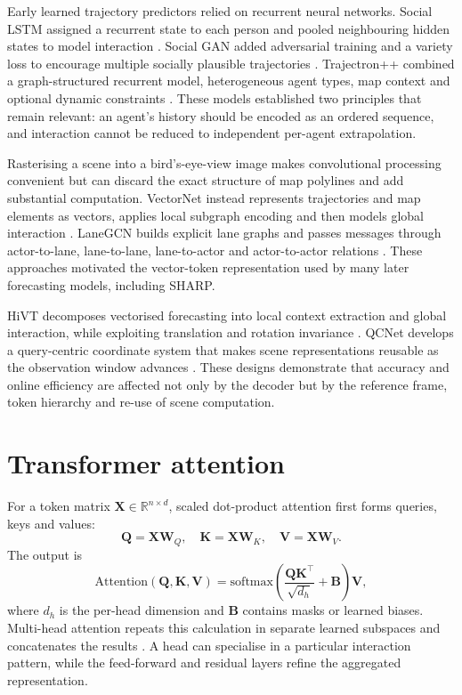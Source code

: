 Early learned trajectory predictors relied on recurrent neural networks. Social LSTM assigned a recurrent state to each person and pooled neighbouring hidden states to model interaction \cite{alahi2016sociallstm}. Social GAN added adversarial training and a variety loss to encourage multiple socially plausible trajectories \cite{gupta2018socialgan}. Trajectron++ combined a graph-structured recurrent model, heterogeneous agent types, map context and optional dynamic constraints \cite{salzmann2020trajectron}. These models established two principles that remain relevant: an agent's history should be encoded as an ordered sequence, and interaction cannot be reduced to independent per-agent extrapolation.

Rasterising a scene into a bird's-eye-view image makes convolutional processing convenient but can discard the exact structure of map polylines and add substantial computation. VectorNet instead represents trajectories and map elements as vectors, applies local subgraph encoding and then models global interaction \cite{gao2020vectornet}. LaneGCN builds explicit lane graphs and passes messages through actor-to-lane, lane-to-lane, lane-to-actor and actor-to-actor relations \cite{liang2020lanegcn}. These approaches motivated the vector-token representation used by many later forecasting models, including SHARP.

HiVT decomposes vectorised forecasting into local context extraction and global interaction, while exploiting translation and rotation invariance \cite{zhou2022hivt}. QCNet develops a query-centric coordinate system that makes scene representations reusable as the observation window advances \cite{zhou2023qcnet}. These designs demonstrate that accuracy and online efficiency are affected not only by the decoder but by the reference frame, token hierarchy and re-use of scene computation.

\section{Transformer attention}

For a token matrix $\mathbf{X}\in\mathbb{R}^{n\times d}$, scaled dot-product attention first forms queries, keys and values:
\begin{equation}
    \mathbf{Q}=\mathbf{X}\mathbf{W}_Q,\quad
    \mathbf{K}=\mathbf{X}\mathbf{W}_K,\quad
    \mathbf{V}=\mathbf{X}\mathbf{W}_V.
\end{equation}
The output is
\begin{equation}
    \mathrm{Attention}(\mathbf{Q},\mathbf{K},\mathbf{V}) =
    \mathrm{softmax}\left(\frac{\mathbf{Q}\mathbf{K}^{\top}}{\sqrt{d_h}}+\mathbf{B}\right)\mathbf{V},
    \label{eq:attention}
\end{equation}
where $d_h$ is the per-head dimension and $\mathbf{B}$ contains masks or learned biases. Multi-head attention repeats this calculation in separate learned subspaces and concatenates the results \cite{vaswani2017attention}. A head can specialise in a particular interaction pattern, while the feed-forward and residual layers refine the aggregated representation.

